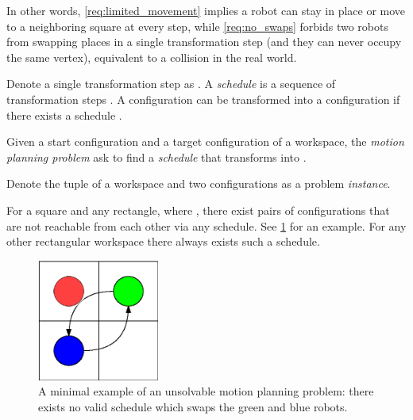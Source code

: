 In other words, \cref{req:limited_movement} implies a robot can stay in place or move to a neighboring square at every step, while \cref{req:no_swaps} forbids two robots from swapping places in a single transformation step (and they can never occupy the same vertex), equivalent to a collision in the real world.

Denote a single transformation step as . A \emph{schedule} is a sequence of transformation steps . A configuration  can be transformed into a configuration  if there exists a schedule .

\begin{definition}\label{def:motion_planning_problem}
	Given a start configuration  and a target configuration  of a workspace, the \emph{motion planning problem} ask to find a \emph{schedule} that transforms  into .
\end{definition}

Denote the tuple of a workspace and two configurations  as a problem \emph{instance}. 

\begin{remark}\label{remark:reachability}
	For a  square and any  rectangle, where , there exist pairs of configurations that are not reachable from each other via any schedule. See \cref{fig:reachability} for an example. For any other rectangular workspace there always exists such a schedule. 
\end{remark}

\begin{figure}[h]
	\centering
	\includegraphics[width=4cm]{include/impossible_2x2.eps}
	\caption{A minimal example of an unsolvable motion planning problem: there exists no valid schedule which swaps the green and blue robots.}\label{fig:reachability}
\end{figure}

